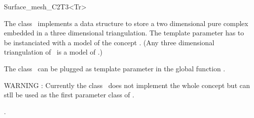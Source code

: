 

\begin{ccRefClass}{Surface_mesh_C2T3<Tr>}  %


\ccDefinition
  
The class \ccRefName\  implements a data structure to store
a two dimensional pure  complex 
embedded in a three dimensional triangulation.
The template parameter  has to be instanciated
with a model of the concept .
(Any three dimensional   triangulation of
\cgal\ is a model of .)

The class \ccRefName\  can be plugged as template parameter
in the global function .




\ccIsModel


WARNING :
Currently the class  \ccRefName\  does not implement the
whole concept 
but can stll be used as the first  parameter class
of  .








\ccSeeAlso

.






\end{ccRefClass}


